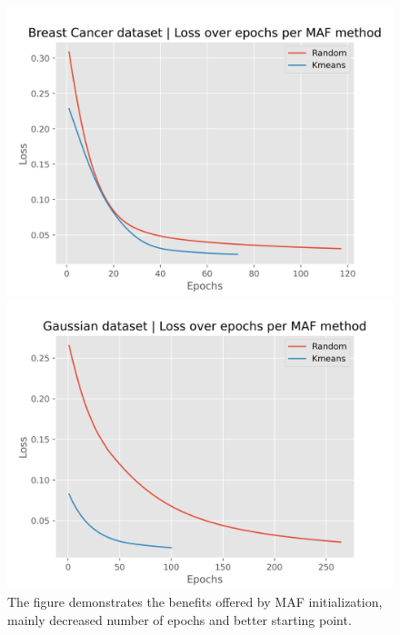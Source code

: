\documentclass[aspectratio=169]{beamer}
\begin{document}
\begin{frame}
\begin{figure}
    \centering
    \begin{minipage}{0.49\textwidth}
        \includegraphics[width=\linewidth]{../../fig/breast-cancer-wisconsin_loss.png}
    \end{minipage}\hfill
    \begin{minipage}{0.49\textwidth}
        \includegraphics[width=\linewidth]{../../fig/gaussian_df_loss.png}
    \end{minipage}
    \caption{The figure demonstrates the benefits offered by MAF initialization, mainly decreased number of epochs and better starting point.}
    \label{fig:maf_benefits}
\end{figure}
\end{frame}
\end{document}

